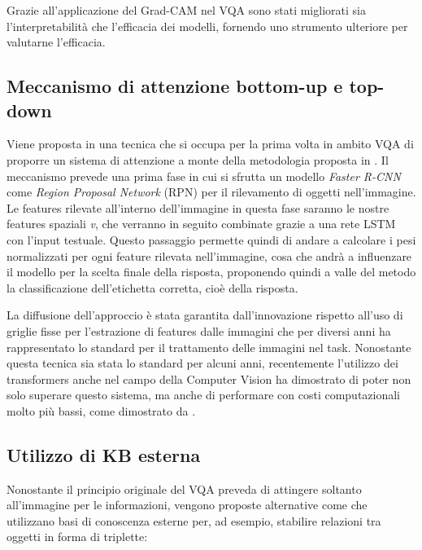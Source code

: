 \documentclass[../main.tex]{subfiles}
\begin{document}
Grazie all'applicazione del Grad-CAM nel VQA sono stati migliorati sia l'interpretabilità che l'efficacia dei modelli, fornendo uno strumento ulteriore per valutarne l'efficacia. 

\subsection{Meccanismo di attenzione bottom-up e top-down}

Viene proposta in \cite{DBLP:journals/corr/AndersonHBTJGZ17} una tecnica che si occupa per la prima volta in ambito VQA di proporre un sistema di attenzione a monte della metodologia proposta in \cite{DBLP:journals/corr/AntolALMBZP15}.
Il meccanismo prevede una prima fase in cui si sfrutta un modello \textit{Faster R-CNN} come \textit{Region Proposal Network} (RPN) per il rilevamento di oggetti nell'immagine. 
Le features rilevate all'interno dell'immagine in questa fase saranno le nostre features spaziali \textit{v}, che verranno in seguito combinate grazie a una rete LSTM con l'input testuale. 
Questo passaggio permette quindi di andare a calcolare i pesi normalizzati per ogni feature rilevata nell'immagine, cosa che andrà a influenzare il modello per la scelta finale della risposta, proponendo quindi a valle del metodo la classificazione dell'etichetta corretta, cioè della risposta.

La diffusione dell'approccio è stata garantita dall'innovazione rispetto all'uso di griglie fisse per l'estrazione di features dalle immagini che per diversi anni ha rappresentato lo standard per il trattamento delle immagini nel task. 
Nonostante questa tecnica sia stata lo standard per alcuni anni, recentemente l'utilizzo dei transformers anche nel campo della Computer Vision ha dimostrato di poter non solo superare questo sistema, ma anche di performare con costi computazionali molto più bassi, come dimostrato da \cite{kim2021viltvisionandlanguagetransformerconvolution}.

\subsection{Utilizzo di KB esterna}

Nonostante il principio originale del VQA preveda di attingere soltanto all'immagine per le informazioni, vengono proposte alternative come \cite{10.1007/978-3-540-76298-0_52} che utilizzano basi di conoscenza esterne per, ad esempio, stabilire relazioni tra oggetti in forma di triplette: 
\end{document}
